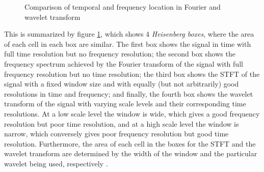 \begin{figure}[H]
\hspace*{-0.7cm}
\centering
{}
\caption{Comparison of temporal and frequency location in Fourier and wavelet transform }
\label{fig:wave}
\end{figure}
This is summarized by figure \ref{fig:wave}, which shows 4 \textit{Heisenberg boxes}, where the area of each cell in each box are similar. The first box shows the signal in time with full time resolution but no frequency resolution; the second box shows the frequency spectrum achieved by the Fourier transform of the signal with full frequency resolution but no time resolution; the third box shows the STFT of the signal with a fixed window size and with equally (but not arbitrarily) good resolutions in time and frequency; and finally, the fourth box shows the wavelet transform of the signal with varying scale levels and their corresponding time resolutions. At a low scale level the window is wide, which gives a good frequency resolution but poor time resolution, and at a high scale level the window is narrow, which conversely gives poor frequency resolution but good time resolution. Furthermore, the area of each cell in the boxes for the STFT and the wavelet transform are determined by the width of the window and the particular wavelet being used, respectively \cite{pages 409-410, Wang} \cite{page 43-44, wave_tut}.


